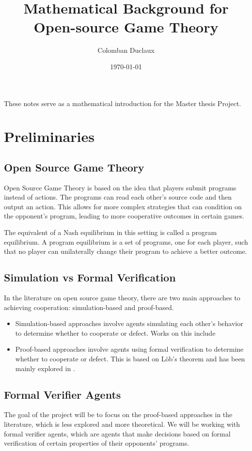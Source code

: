 \documentclass{article}
\title{Mathematical Background for Open-source Game Theory}
\author{Colomban Duclaux}
\date{\today}
\begin{document}
\maketitle

These notes serve as a mathematical introduction for the Master thesis Project.

\section{Preliminaries}
\subsection{Open Source Game Theory}
Open Source Game Theory is based on the idea that players submit programs instead of actions. The programs can read each other's source code and then output an action. This allows for more complex strategies that can condition on the opponent's program, leading to more cooperative outcomes in certain games.

The equivalent of a Nash equilibrium in this setting is called a program equilibrium. A program equilibrium is a set of programs, one for each player, such that no player can unilaterally change their program to achieve a better outcome.

\subsection{Simulation vs Formal Verification}
In the literature on open source game theory, there are two main approaches to achieving cooperation: simulation-based and proof-based.
\begin{itemize}
    \item Simulation-based approaches involve agents simulating each other's behavior to determine whether to cooperate or defect. Works on this include \cite{robust_program_equilibrium,caspar_oesterheld_program_equilibrium,cooper2025characterisingsimulationbasedprogramequilibria}
    \item Proof-based approaches involve agents using formal verification to determine whether to cooperate or defect. This is based on Löb's theorem and has been mainly explored in \cite{critch2022cooperativeuncooperativeinstitutiondesigns}.
\end{itemize}

\subsection{Formal Verifier Agents}
The goal of the project will be to focus on the proof-based approaches in the literature, which is less explored and more theoretical. We will be working with formal verifier agents, which are agents that make decisions based on formal verification of certain properties of their opponents' programs.
\end{document}
